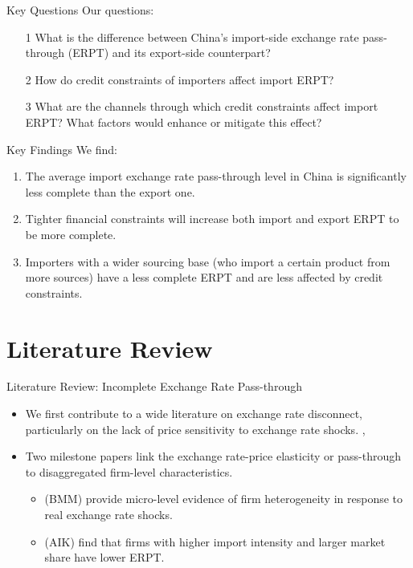 \documentclass[10pt]{beamer}
\begin{document}
\begin{frame}{Key Questions}
Our questions:
	\begin{itemize}
		\item [1] What is the difference between China's import-side exchange rate pass-through (ERPT) and its export-side counterpart?
		\item [2] How do credit constraints of importers affect import ERPT?
		\item [3] What are the channels through which credit constraints affect import ERPT? What factors would enhance or mitigate this effect?
	\end{itemize}
\end{frame}

\begin{frame}{Key Findings}
We find:	
	\begin{enumerate}
		\item The average import exchange rate pass-through level in China is significantly less complete than the export one.
		\item Tighter financial constraints will increase both import and export ERPT to be more complete.
		\item Importers with a wider sourcing base (who import a certain product from more sources) have a less complete ERPT and are less affected by credit constraints.
	\end{enumerate}	
\end{frame}

\section{Literature Review}

\begin{frame}{Literature Review: Incomplete Exchange Rate Pass-through}
	\begin{itemize}
		\item We first contribute to a wide literature on exchange rate disconnect, particularly on the lack of price sensitivity to exchange rate shocks. \cite{obstfeld2000}, \cite{campa2005}
		\item Two milestone papers link the exchange rate-price elasticity or pass-through to
		disaggregated firm-level characteristics.
		\begin{itemize}
			\item \cite{bmm2012} (BMM) provide micro-level evidence of firm heterogeneity in response to real exchange rate shocks.
			\item \cite{aik2014} (AIK) find that
			firms with higher import intensity and larger market share have lower ERPT.
		\end{itemize}
		
	\end{itemize}
\end{frame}
\end{document}
